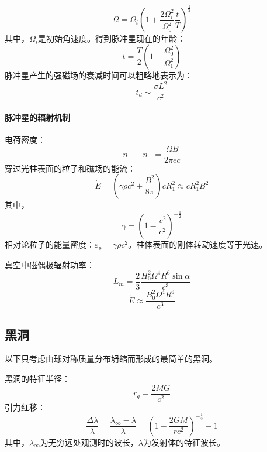 \begin{equation}
	\Omega=\Omega_{i}\left(1+\frac{2\Omega_{i}^2}{\Omega_{0}^2}\frac{t}{T}\right)^{\frac{1}{2}}
\end{equation}
其中，$\Omega_{i}$是初始角速度。得到脉冲星现在的年龄：
\begin{equation}
	t=\frac{T}{2}\left(1-\frac{\Omega_{0}^2}{\Omega_{1}^2}\right)
\end{equation}
脉冲星产生的强磁场的衰减时间可以粗略地表示为：
\begin{equation}
	t_{d}\sim\frac{\sigma L^2}{c^2}
\end{equation}
\paragraph{脉冲星的辐射机制}
电荷密度：
\begin{equation}
	n_{-}-n_{+}=\frac{\Omega B}{2\pi ec}
\end{equation}
穿过光柱表面的粒子和磁场的能流：
\begin{equation}
	\dot{E}=\left(\gamma \rho c^2+\frac{B^2}{8\pi}\right)cR_{1}^2\approx cR_{1}^2B^2
\end{equation}
其中，
\begin{equation}
	\gamma =\left(1-\frac{v^2}{c^2}\right)^{-\frac{1}{2}}
\end{equation}
相对论粒子的能量密度：$\varepsilon_{p}=\gamma\rho c^2$。柱体表面的刚体转动速度等于光速。

真空中磁偶极辐射功率：
\begin{equation}
	L_{m}=\frac{2}{3}\frac{H_{0}^2\Omega^4R^6\sin\alpha}{c^3}
\end{equation}
\begin{equation}
	\dot{E}\approx\frac{B_{0}^2\Omega^4R^6}{c^3}
\end{equation}
\subsection{黑洞}
以下只考虑由球对称质量分布坍缩而形成的最简单的黑洞。

黑洞的特征半径：
\begin{equation}
	r_{g}=\frac{2MG}{c^2}
\end{equation}
引力红移：
\begin{equation}
	\frac{\Delta \lambda}{\lambda}=\frac{\lambda_{\infty}-\lambda}{\lambda}=\left(1-\frac{2GM}{rc^2}\right)^{-\frac{1}{2}}-1
\end{equation}
其中，$\lambda_{\infty}$为无穷远处观测时的波长，$\lambda$为发射体的特征波长。

